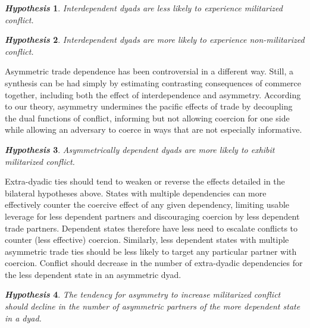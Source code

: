 \documentclass[12pt]{article}
\theoremstyle{hypothesis}
\newtheorem{hypothesis}{\it Hypothesis}
\begin{document}
\begin{hypothesis}
\upshape Interdependent dyads are less likely to experience militarized conflict.
\end{hypothesis}
\begin{hypothesis}
\upshape Interdependent dyads are more likely to experience non-militarized conflict.
\end{hypothesis}

Asymmetric trade dependence has been controversial in a different way.  Still, a synthesis can be had simply by estimating contrasting consequences of commerce together, including both the effect of interdependence and asymmetry.  According to our theory, asymmetry undermines the pacific effects of trade by decoupling the dual functions of conflict, informing but not allowing coercion for one side while allowing an adversary to coerce in ways that are not especially informative.

\begin{hypothesis}
\begin{minipage}[t]{5.5 in}
\upshape Asymmetrically dependent dyads are more likely to exhibit militarized conflict.
\end{minipage}
\end{hypothesis}

Extra-dyadic ties should tend to weaken or reverse the effects detailed in the bilateral hypotheses above.  States with multiple dependencies can more effectively counter the coercive effect of any given dependency, limiting usable leverage for less dependent partners and discouraging coercion by less dependent trade partners.  Dependent states therefore have less need to escalate conflicts to counter (less effective) coercion. Similarly, less dependent states with multiple asymmetric trade ties should be less likely to target any particular partner with coercion.  Conflict should decrease in the number of extra-dyadic dependencies for the less dependent state in an asymmetric dyad.

\begin{hypothesis}
\begin{minipage}[t]{5.5 in}
\upshape The tendency for asymmetry to increase militarized conflict should decline in the number of asymmetric partners of the more dependent state in a dyad. \end{minipage}
\end{hypothesis}
\end{document}

